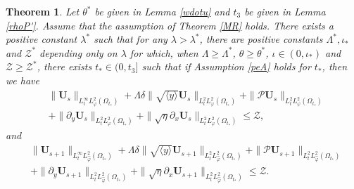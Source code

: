 \documentclass[10pt,a4paper]{amsart}
\newtheorem{theorem}{Theorem}
\newcommand\y{{{\langle y \rangle}}}
\begin{document}
\begin{theorem}\label{Phe}
Let $\theta^{*}$ be given in Lemma \ref{wdotu} and $t_{3}$ be given in Lemma \ref{rhoP'}. Assume that the assumption of Theorem \ref{MR} holds.
There exists a positive constant $\lambda^{*}$ such that for any $\lambda>\lambda^{*}$, there are positive constants $\Lambda^{*}, \iota_{*}$ and $\mathcal{Z}^{*}$ depending only on $\lambda$ for which, when $\Lambda\geq\Lambda^{*}$, $\theta\geq\theta^{*}$, $\iota\in(0,\iota_{*})$ and $\mathcal{Z}\geq\mathcal{Z}^{*}$, there exists $t_{*}\in(0,t_{3}]$ such that if Assumption \ref{peA} holds for $t_{*}$, then we have
\begin{align}\label{Hoe1}
&\|\mathbf{U}_{s}\|_{L_{t}^{\infty}L_{\varphi}^{2}(\Omega_{t_{*}})}
 +\Lambda\delta\|\sqrt{\y}\mathbf{U}_{s}\|_{L_{t}^{2}L_{\varphi}^{2}(\Omega_{t_{*}})}
 +\|\mathcal{P}\mathbf{U}_{s}\|_{L_{t}^{2}L_{\varphi}^{2}(\Omega_{t_{*}})}\\
&+\|\partial_{y}\mathbf{U}_{s}\|_{L_{t}^{2}L_{\varphi}^{2}(\Omega_{t_{*}})}
 +\|\sqrt{\eta}\partial_{x}\mathbf{U}_{s}\|_{L_{t}^{2}L_{\varphi}^{2}(\Omega_{t_{*}})}
\leq \mathcal{Z},\nonumber
\end{align}
and
\begin{align}\label{Hoe2}
&\|\mathbf{U}_{s+1}\|_{L_{t}^{\infty}L_{\hat{\varphi}}^{2}(\Omega_{t_{*}})}
 +\Lambda\delta\|\sqrt{\y}\mathbf{U}_{s+1}\|_{L_{t}^{2}L_{\hat{\varphi}}^{2}(\Omega_{t_{*}})}
 +\|\mathcal{P}\mathbf{U}_{s+1}\|_{L_{t}^{2}L_{\hat{\varphi}}^{2}(\Omega_{t_{*}})}\\
&+\|\partial_{y}\mathbf{U}_{s+1}\|_{L_{t}^{2}L_{\hat{\varphi}}^{2}(\Omega_{t_{*}})}
 +\|\sqrt{\eta}\partial_{x}\mathbf{U}_{s+1}\|_{L_{t}^{2}L_{\hat{\varphi}}^{2}(\Omega_{t_{*}})}
\leq \mathcal{Z}.\nonumber
\end{align}
\end{theorem}
\end{document}
